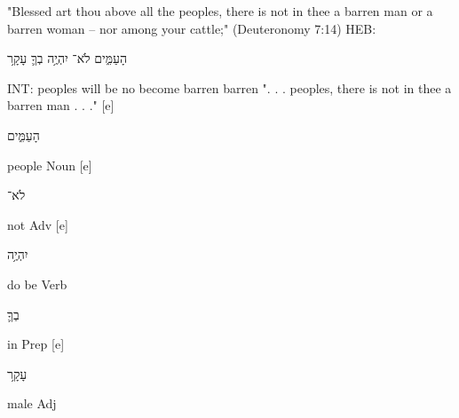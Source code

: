 \documentclass[11pt]{article}
\begin{document}
"Blessed art thou above all the peoples, there is not in thee a barren man or a barren woman -- nor among your cattle;"\newline
(Deuteronomy 7:14) \newline
HEB: \begin{hebrew} הָעַמִּ֑ים לֹא־ יִהְיֶ֥ה בְךָ֛ עָקָ֥ר	\end{hebrew}\newline
INT: peoples will be no become barren barren\newline
". . . peoples, there is not in thee a barren man . . ." [e]%
\begin{hebrew}	הָעַמִּ֑ים	\end{hebrew}people	Noun [e]%
\begin{hebrew} לֹא־ \end{hebrew}	not	Adv [e]%
\begin{hebrew}	יִהְיֶ֥ה	\end{hebrew}do be	Verb\newline
\phantom{1961 [e]	} %
\begin{hebrew}בְךָ֛	\end{hebrew}in	Prep [e]%
\begin{hebrew}עָקָ֥ר\end{hebrew}	male	Adj\newline
\end{document}
